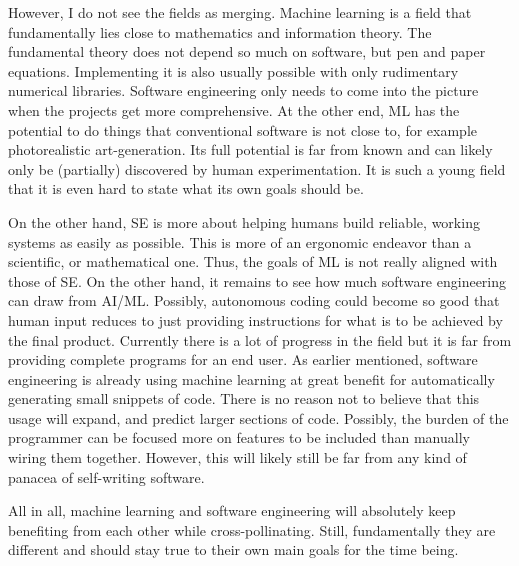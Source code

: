 \documentclass{article}
\begin{document}
However, I do not see the fields as merging.
Machine learning is a field that fundamentally lies close to mathematics and information theory.
The fundamental theory does not depend so much on software, but pen and paper equations.
Implementing it is also usually possible with only rudimentary numerical libraries.
Software engineering only needs to come into the picture when the projects get more comprehensive.
At the other end, ML has the potential to do things that conventional software is not close to, for example photorealistic art-generation.
Its full potential is far from known and can likely only be (partially) discovered by human experimentation.
It is such a young field that it is even hard to state what its own goals should be.

On the other hand, SE is more about helping humans build reliable, working systems as easily as possible.
This is more of an ergonomic endeavor than a scientific, or mathematical one. 
Thus, the goals of ML is not really aligned with those of SE.
On the other hand, it remains to see how much software engineering can draw from AI/ML.
Possibly, autonomous coding could become so good that human input reduces to just providing instructions for what is to be achieved by the final product.
Currently there is a lot of progress in the field but it is far from providing complete programs for an end user.
As earlier mentioned, software engineering is already using machine learning at great benefit for automatically generating small snippets of code.
There is no reason not to believe that this usage will expand, and predict larger sections of code.
Possibly, the burden of the programmer can be focused more on features to be included than manually wiring them together.
However, this will likely still be far from any kind of panacea of self-writing software.

All in all, machine learning and software engineering will absolutely keep benefiting from each other while cross-pollinating.
Still, fundamentally they are different and should stay true to their own main goals for the time being.
\end{document}
